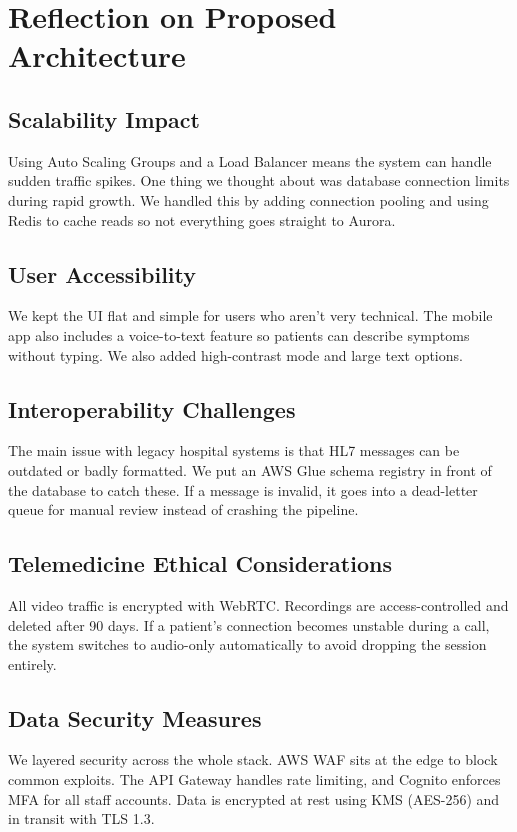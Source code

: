 \documentclass{article}
\begin{document}
\vspace{8cm}
\section{Reflection on Proposed Architecture}

\subsection{Scalability Impact}
Using Auto Scaling Groups and a Load Balancer means the system can handle sudden traffic spikes. One thing we thought about was database connection limits during rapid growth. We handled this by adding connection pooling and using Redis to cache reads so not everything goes straight to Aurora.

\subsection{User Accessibility}
We kept the UI flat and simple for users who aren't very technical. The mobile app also includes a voice-to-text feature so patients can describe symptoms without typing. We also added high-contrast mode and large text options.

\subsection{Interoperability Challenges}
The main issue with legacy hospital systems is that HL7 messages can be outdated or badly formatted. We put an AWS Glue schema registry in front of the database to catch these. If a message is invalid, it goes into a dead-letter queue for manual review instead of crashing the pipeline.

\subsection{Telemedicine Ethical Considerations}
All video traffic is encrypted with WebRTC. Recordings are access-controlled and deleted after 90 days. If a patient's connection becomes unstable during a call, the system switches to audio-only automatically to avoid dropping the session entirely.

\subsection{Data Security Measures}
We layered security across the whole stack. AWS WAF sits at the edge to block common exploits. The API Gateway handles rate limiting, and Cognito enforces MFA for all staff accounts. Data is encrypted at rest using KMS (AES-256) and in transit with TLS 1.3.
\end{document}
